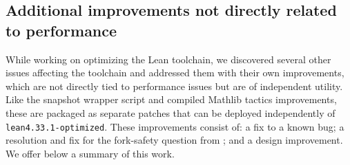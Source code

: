 \documentclass{article}
\newcommand{\Lean}{Lean\xspace}      %
\newcommand{\mathlib}{Mathlib\xspace}
\newcommand{\altlean}{\texttt{lean4.33.1-\allowbreak optimized}\xspace}
\begin{document}
\subsection{Additional improvements not directly related to performance}

While working on optimizing the \Lean toolchain, we discovered
several other issues affecting the toolchain and addressed them with their own improvements, which are not directly tied to performance issues but are of independent utility. Like the snapshot wrapper script and compiled \mathlib tactics improvements, these are packaged as separate patches that can be deployed independently of \altlean. These improvements consist of: a fix to a known bug; a resolution and fix for the fork-safety question from \cite{repl87,repl84}; and a design improvement. We offer below a summary of this work.
\end{document}
